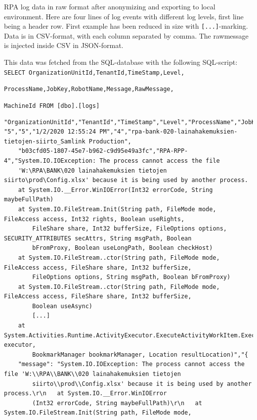 RPA log data in raw format after anonymizing and exporting to local environment.
Here are four lines of log events with different log levels,
first line being a header row.
First example has been reduced in size with \verb-[...]--marking.
Data is in CSV-format,
with each column separated by comma.
The rawmessage is injected inside CSV
in JSON-format.

This data was fetched from the SQL-database
with the following SQL-script:
\verb=SELECT OrganizationUnitId,TenantId,TimeStamp,Level,=

\verb=ProcessName,JobKey,RobotName,Message,RawMessage,=

\verb=MachineId FROM [dbo].[logs]=

\begin{Verbatim}[fontsize=\tiny]
"OrganizationUnitId","TenantId","TimeStamp","Level","ProcessName","JobKey","RobotName","Message","RawMessage","MachineId"
"5","5","1/2/2020 12:55:24 PM","4","rpa-bank-020-lainahakemuksien-tietojen-siirto_Samlink Production",
    "b03cfd05-1807-45e7-b962-c9d95e49a3fc","RPA-RPP-4","System.IO.IOException: The process cannot access the file
    'W:\RPA\BANK\020 lainahakemuksien tietojen siirto\prod\Config.xlsx' because it is being used by another process.
    at System.IO.__Error.WinIOError(Int32 errorCode, String maybeFullPath)
    at System.IO.FileStream.Init(String path, FileMode mode, FileAccess access, Int32 rights, Boolean useRights,
        FileShare share, Int32 bufferSize, FileOptions options, SECURITY_ATTRIBUTES secAttrs, String msgPath, Boolean
        bFromProxy, Boolean useLongPath, Boolean checkHost)
    at System.IO.FileStream..ctor(String path, FileMode mode, FileAccess access, FileShare share, Int32 bufferSize,
        FileOptions options, String msgPath, Boolean bFromProxy)
    at System.IO.FileStream..ctor(String path, FileMode mode, FileAccess access, FileShare share, Int32 bufferSize,
        Boolean useAsync)
        [...]
    at System.Activities.Runtime.ActivityExecutor.ExecuteActivityWorkItem.ExecuteBody(ActivityExecutor executor,
        BookmarkManager bookmarkManager, Location resultLocation)","{
    "message": "System.IO.IOException: The process cannot access the file 'W:\\RPA\\BANK\\020 lainahakemuksien tietojen
        siirto\\prod\\Config.xlsx' because it is being used by another process.\r\n   at System.IO.__Error.WinIOError
        (Int32 errorCode, String maybeFullPath)\r\n   at System.IO.FileStream.Init(String path, FileMode mode,

\end{Verbatim}
